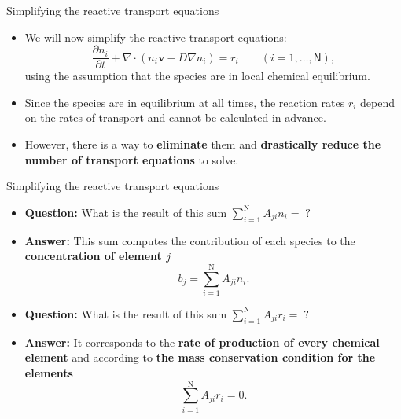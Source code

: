 %
%
\begin{frame}[<+->]{Simplifying the reactive transport equations }
\begin{itemize}
\item We will now simplify the reactive transport equations:
\[
\frac{\partial n_{i}}{\partial t}+\nabla\cdot(n_{i}\boldsymbol{v}-D\nabla n_{i})=r_{i}\qquad(i=1,\ldots,\mathsf{N}),
\]
using the assumption that the species are in \alert{local chemical equilibrium}. 
\item Since the species are in equilibrium at all times, the reaction rates
$r_{i}$ \alert{depend on the rates of transport} and \alert{cannot be calculated in advance}.
\item However, there is a way to \textbf{eliminate} them and \textbf{drastically
reduce the number of transport equations} to solve.
\end{itemize}
\end{frame}
%
%
\begin{frame}{Simplifying the reactive transport equations }
\begin{itemize}
\item \textbf{Question:} What is the result of this sum 
$
\sum_{i=1}^{\text{N}}A_{ji}n_{i}=\;?
$
\item \textbf{Answer:} This sum computes the contribution of each species to the \alert{\bf concentration of element $j$}
\[
b_j = \sum_{i=1}^{\mathrm{N}}A_{ji}n_{i}.
\]
%
\item \textbf{Question:} What is the result of this sum 
%
$\sum_{i=1}^{\mathrm{N}}A_{ji}r_{i}=\;?$
%
\item \textbf{Answer:} It corresponds to the \alert{\bf rate of production of every chemical
element} and according to {\bf the mass conservation condition for the elements}
%
\[
\sum_{i=1}^{\mathrm{N}}A_{ji}r_{i}=0.
\]
\end{itemize}
\end{frame}
%
